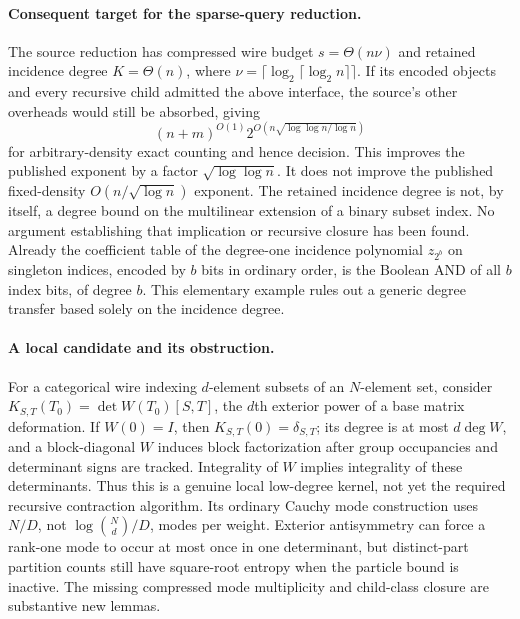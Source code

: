 \paragraph{Consequent target for the sparse-query reduction.}
The source reduction has compressed wire budget $s=\Theta(n\nu)$ and retained
incidence degree $K=\Theta(n)$, where $\nu=\lceil\log_2\lceil\log_2 n\rceil\rceil$.
If its encoded objects and every recursive child admitted the above
interface, the source's other overheads would still be absorbed, giving
\[
 (n+m)^{O(1)}2^{O(n\sqrt{\log\log n/\log n})}
\]
for arbitrary-density exact counting and hence decision. This improves the
published exponent by a factor $\sqrt{\log\log n}$. It does not improve the
published fixed-density $O(n/\sqrt{\log n})$ exponent.
The retained incidence degree is not, by itself, a degree bound on the
multilinear extension of a binary subset index. No argument establishing
that implication or recursive closure has been found. Already the coefficient
table of the degree-one incidence polynomial $z_{2^b}$ on singleton indices,
encoded by $b$ bits in ordinary order, is the Boolean AND of all $b$ index
bits, of degree $b$. This elementary example rules out a generic degree
transfer based solely on the incidence degree.

\paragraph{A local candidate and its obstruction.}
For a categorical wire indexing $d$-element subsets of an $N$-element set,
consider $K_{S,T}(T_0)=\det W(T_0)[S,T]$, the $d$th exterior power of a base
matrix deformation. If $W(0)=I$, then $K_{S,T}(0)=\delta_{S,T}$; its degree is
at most $d\deg W$, and a block-diagonal $W$ induces block factorization after
group occupancies and determinant signs are tracked. Integrality of $W$
implies integrality of these determinants. Thus this is a genuine local
low-degree kernel, not yet the required recursive contraction algorithm.
Its ordinary Cauchy mode construction uses $N/D$, not
$\log\binom Nd/D$, modes per weight. Exterior antisymmetry can force a
rank-one mode to occur at most once in one determinant, but distinct-part
partition counts still have square-root entropy when the particle bound
is inactive. The missing compressed mode multiplicity and child-class
closure are substantive new lemmas.
